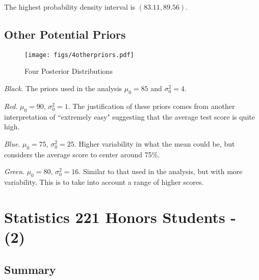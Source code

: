 \documentclass[12pt]{article}
\begin{document}
\noindent The highest probability density interval is $(83.11, 89.56)$.


\subsection{Other Potential Priors}

\begin{figure}[H]
\begin{center}
\texttt{[image: figs/4otherpriors.pdf]}
\caption{Four Posterior Distributions}
\end{center}
\end{figure}

\noindent \textit{Black}.  The priors used in the analysis $\mu_0=85$ and $\sigma_0^2=4$.

\noindent \textit{Red}. $\mu_0=90$, $\sigma_0^2=1$.  The justification of these priors comes from another interpretation of ``extremely easy" suggesting that the average test score is quite high.

\noindent \textit{Blue}. $\mu_0=75$, $\sigma_0^2=25$.  Higher variability in what the mean could be, but considers the average score to center around 75\%.

\noindent \textit{Green}. $\mu_0=80$, $\sigma_0^2=16$.  Similar to that used in the analysis, but with more variability.  This is to take into account a range of higher scores.

%

\newpage

\section{Statistics 221 Honors Students - (2)}

\subsection{Summary}
\end{document}
